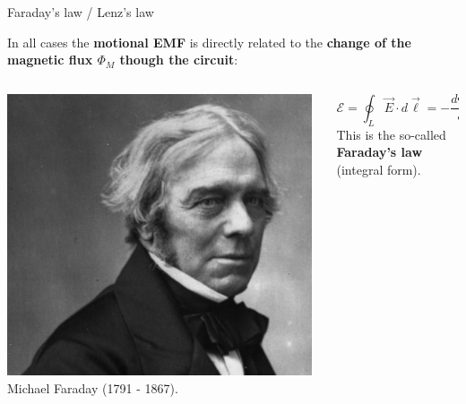 \begin{frame}{Faraday's law / Lenz's law}

In all cases the {\bf motional EMF} is directly related
to the {\bf change of the magnetic flux $\Phi_{M}$ though the circuit}:\\

\vspace{0.1cm}

\begin{columns} [T]
  \begin{column}{0.25\textwidth}
    \includegraphics[width=0.98\textwidth]{./images/people/faraday.png}\\
    {\tiny Michael Faraday (1791 - 1867).}
  \end{column}
  \begin{column}{0.75\textwidth}
   \begin{center}
    {\color{red}
    \begin{equation*}
      \mathcal{E} = \oint_{L} \vec{E} \cdot d\vec{\ell} = - \frac{d\Phi_{M}}{dt}
    \end{equation*}
    }
    \vspace{0.2cm}
    This is the so-called {\bf Faraday's law} (integral form).
   \end{center}
  \end{column}
\end{columns}

\vspace{0.1cm}


\end{frame}
